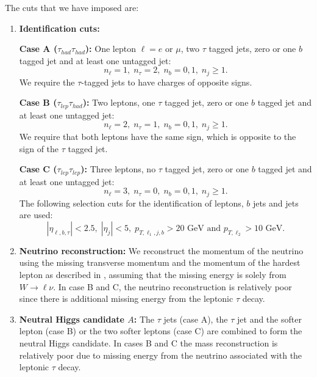 The cuts that we have imposed are:
\begin{enumerate}

\item \textbf{Identification cuts:} 

\textbf{Case A ($\tau_{had}\tau_{had}$):} {One lepton $\ell = e$ or $\mu$, two $\tau$ tagged jets, zero or one $b$ tagged jet and at least one untagged jet:} 
\begin{equation}
n_{\ell} = 1, \; n_{\tau} = 2, \; n_b = 0,1 ,\; n_{j} \geq 1.
\label{eqA}
\end{equation}
We require the $\tau$-tagged jets to have charges of opposite signs.

\textbf{Case B ($\tau_{lep}\tau_{had}$):} {Two leptons, one $\tau$ tagged jet, zero or one $b$ tagged jet and at least one untagged jet:}
\begin{equation}
n_{\ell} = 2, \; n_{\tau} = 1,\; n_b = 0,1 , \;n_{j} \geq 1.
\label{eqB}
\end{equation}
We require that both leptons have the same sign, which is opposite to the sign of the $\tau$ tagged jet.

\textbf{Case C ($\tau_{lep}\tau_{lep}$):} {Three leptons, no $\tau$ tagged jet, zero or one $b$ tagged jet and at least one untagged jet:}
\begin{equation}
n_{\ell} = 3, \; n_{\tau} = 0, \; n_b = 0,1 ,\; n_{j} \geq 1.
\label{eqC}
\end{equation}
The following selection cuts for the identification of leptons, $b$ jets and jets are used:
\begin{equation}
|\eta_{\ell,b,\tau}| < 2.5, \; |\eta_{j}| < 5, \; p_{T, \ell_1, j, b} > 20 \text{ GeV and } p_{T, \ell_{2}} > 10 \text{ GeV.}
\label{eqID}
\end{equation}


\item \textbf{Neutrino reconstruction:} 
We reconstruct the momentum of the neutrino using the missing transverse momentum and the momentum of the hardest lepton as described in \cite{Aad:2012ux}, assuming that the missing energy is solely from $W\rightarrow \ell \nu$. In case B and C, the neutrino reconstruction is relatively poor since there is additional missing energy from the leptonic $\tau$ decay. 

\item \textbf{Neutral Higgs candidate $A$:} The $\tau$ jets (case A), the $\tau$ jet and the softer lepton (case B) or the two softer leptons (case C) are combined to form the neutral Higgs candidate. {In cases B and C the mass reconstruction is relatively poor due to missing energy from the neutrino associated with the leptonic $\tau$ decay. }


\end{enumerate}
